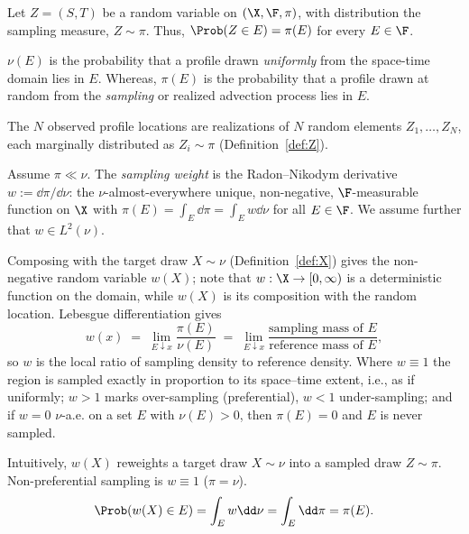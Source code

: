 \begin{definition}
\label{def:Z}
Let $Z = (S,T)$ be a random variable on $(\X,\F,\pi)$, with distribution the sampling measure, $Z \sim \pi$.
Thus, $\Prob(Z \in E) = \pi(E)$ for every $E \in \F$.
\end{definition}

$\nu(E)$ is the probability that a profile drawn \emph{uniformly} from the space-time domain lies in $E$.
Whereas, $\pi(E)$ is the probability that a profile drawn at random from the \emph{sampling} or realized advection process lies in $E$.

\begin{definition}
\label{def:Zi}
The $N$ observed profile locations are realizations of $N$ random elements $Z_1,\dots,Z_N$, each marginally distributed as $Z_i \sim \pi$ (Definition~\ref{def:Z}).
\end{definition}

\begin{definition}
\label{def:w}
Assume $\pi \ll \nu$. The \emph{sampling weight} is the Radon--Nikodym
derivative $w := \dd\pi/\dd\nu$: the $\nu$-almost-everywhere unique,
non-negative, $\F$-measurable function on $\X$ with
$\pi(E)=\int_E \dd\pi = \int_E w\dd\nu$ for all $E\in\F$. We assume further that
$w \in L^2(\nu)$.
\end{definition}

Composing with the target draw $X\sim\nu$ (Definition~\ref{def:X}) gives
the non-negative random variable $w(X)$; note that $w:\X\to[0,\infty)$ is
a deterministic function on the domain, while $w(X)$ is its composition
with the random location. Lebesgue differentiation gives
\[
  w(x) \;=\; \lim_{E \downarrow x} \frac{\pi(E)}{\nu(E)}
        \;=\; \lim_{E \downarrow x}
              \frac{\text{sampling mass of } E}{\text{reference mass of } E},
\]
so $w$ is the local ratio of sampling density to reference density. Where
$w \equiv 1$ the region is sampled exactly in proportion to its
space--time extent, i.e., as if uniformly; $w > 1$ marks over-sampling
(preferential), $w < 1$ under-sampling; and if $w = 0$ $\nu$-a.e. on a set
$E$ with $\nu(E)>0$, then $\pi(E)=0$ and $E$ is never sampled.

Intuitively, $w(X)$ reweights a target draw $X\sim\nu$ into a sampled draw $Z\sim\pi$.
Non-preferential sampling is $w\equiv 1$ ($\pi=\nu$).
\[
  \Prob(w(X) \in E) = \int_E w\dd\nu = \int_E \dd\pi = \pi(E).
\]


